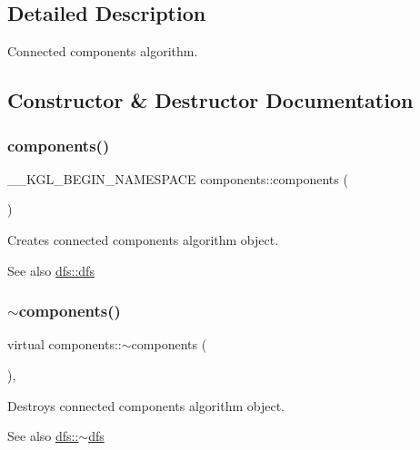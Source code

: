 \subsection{Detailed Description}
Connected components algorithm. 

\subsection{Constructor \& Destructor Documentation}
\mbox{\label{classcomponents_a41b8782301c7985dfa202a04df76712d}} 
\subsubsection{\texorpdfstring{components()}{components()}}
{\footnotesize\ttfamily \+\_\+\+\_\+\+K\+G\+L\+\_\+\+B\+E\+G\+I\+N\+\_\+\+N\+A\+M\+E\+S\+P\+A\+CE components\+::components (\begin{DoxyParamCaption}{ }\end{DoxyParamCaption})}



Creates connected components algorithm object. 

\begin{DoxySeeAlso}{See also}
\mbox{\hyperlink{classdfs_a5232bc41ab202b6278a84bd97c803a0d}{dfs\+::dfs}} 
\end{DoxySeeAlso}
\mbox{\label{classcomponents_aa38e55d08dd484dad3175617264056a5}} 
\subsubsection{\texorpdfstring{$\sim$components()}{~components()}}
{\footnotesize\ttfamily virtual components\+::$\sim$components (\begin{DoxyParamCaption}{ }\end{DoxyParamCaption})\hspace{0.3cm}{\ttfamily [inline]}, {\ttfamily [virtual]}}



Destroys connected components algorithm object. 

\begin{DoxySeeAlso}{See also}
\mbox{\hyperlink{classdfs_aff2e95c12935221a94551393f7e36c6e}{dfs\+::$\sim$dfs}} 
\end{DoxySeeAlso}


